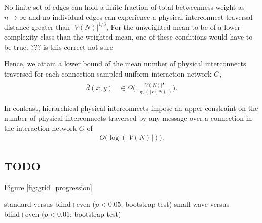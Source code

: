 No finite set of edges can hold a finite fraction of total betweenness weight as $n \rightarrow \infty$ and no individual edges can experience a physical-interconnect-traversal distance greater than $|V(N)|^{1/3}$,
For the unweighted mean to be of a lower complexity class than the weighted mean, one of these conditions would have to be true.
??? is this correct not sure

Hence, we attain a lower bound of the mean number of physical interconnects traversed for each connection sampled uniform interaction network $G$,
\begin{align*}
\bar{d}(x, y)
&\in
\Omega \Big(
  \frac{|V(N)|^{\frac{1}{3}}}{\log(|V(N)|)}
\Big).
\end{align*}

In contrast, hierarchical physical interconnects impose an upper constraint on the number of physical interconnects traversed by any message over a connection in the interaction network $G$ of
\begin{align*}
O\Big(\log(|V(N)|)\Big).
\end{align*}



\subsection{TODO}

Figure \ref{fig:grid_progression}

standard versus blind+even ($p < 0.05$; bootstrap test)
small wave versus blind+even ($p < 0.01$; bootstrap test)
